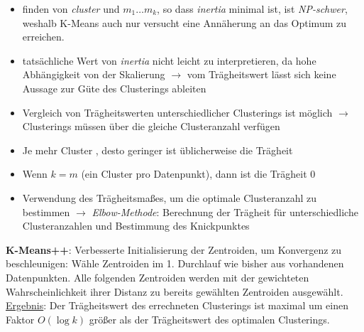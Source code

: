 \begin{itemize}
    \item finden von \emph{cluster} und $m_1\dots m_k$, so dass \emph{inertia} minimal ist, ist \emph{NP-schwer}, weshalb K-Means auch nur versucht eine Annäherung an das Optimum zu erreichen.
    \item tatsächliche Wert von \emph{inertia} nicht leicht zu interpretieren, da hohe Abhängigkeit von der Skalierung $\rightarrow$ vom Trägheitswert lässt sich keine Aussage zur Güte des Clusterings ableiten
    \item Vergleich von Trägheitswerten unterschiedlicher Clusterings ist möglich $\rightarrow$ Clusterings müssen über die gleiche Clusteranzahl verfügen
    \item Je mehr Cluster , desto geringer ist üblicherweise die Trägheit
    \item Wenn $k=m$ (ein Cluster pro Datenpunkt), dann ist die Trägheit $0$
    \item Verwendung des Trägheitsmaßes, um die optimale Clusteranzahl zu bestimmen $\rightarrow$ \emph{Elbow-Methode}: Berechnung der Trägheit für unterschiedliche Clusteranzahlen und Bestimmung des Knickpunktes
\end{itemize}


\textbf{K-Means++}: Verbesserte Initialisierung der Zentroiden, um Konvergenz zu beschleunigen: Wähle Zentroiden im 1. Durchlauf wie bisher aus vorhandenen Datenpunkten. Alle folgenden Zentroiden werden mit der gewichteten Wahrscheinlichkeit ihrer Distanz zu bereits gewählten Zentroiden ausgewählt. \underline{Ergebnis}: Der Trägheitswert des errechneten Clusterings ist maximal um einen Faktor $O(\log k)$ größer als der Trägheitswert des optimalen Clusterings.\\